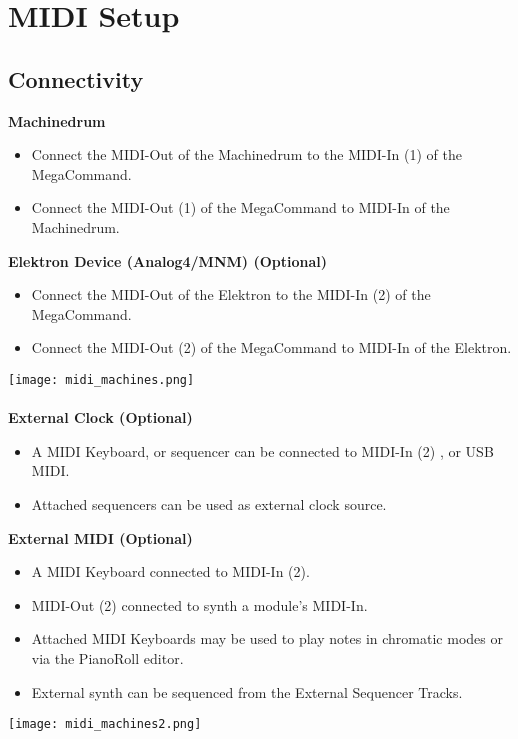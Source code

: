 \chapter{MIDI Setup}
\section{Connectivity}
\textbf{Machinedrum}
\begin{itemize}
    \item Connect the MIDI-Out of the Machinedrum to the MIDI-In (1) of the MegaCommand.
    \item Connect the MIDI-Out (1) of the MegaCommand to MIDI-In of the Machinedrum.
\end{itemize}

\textbf{Elektron Device (Analog4/MNM) (Optional)}
\begin{itemize}
    \item Connect the MIDI-Out of the Elektron to the MIDI-In (2) of the MegaCommand. 
    \item Connect the MIDI-Out (2) of the MegaCommand to MIDI-In of the Elektron.
\end{itemize}
\texttt{[image: midi\_machines.png]}\\
\\
\textbf{External Clock (Optional)} 

\begin{itemize}
    \item A MIDI Keyboard, or sequencer can be connected to MIDI-In (2) , or USB MIDI. 
    \item Attached sequencers can be used as external clock source.
\end{itemize}

\textbf{External MIDI (Optional)}

\begin{itemize}
    \item A MIDI Keyboard connected to MIDI-In (2). 
    \item MIDI-Out (2) connected to synth a module's MIDI-In.
    \item Attached MIDI Keyboards may be used to play notes in chromatic modes or via the PianoRoll editor.
    \item External synth can be sequenced from the External Sequencer Tracks.
\end{itemize}



\newpage

\texttt{[image: midi\_machines2.png]}\\
